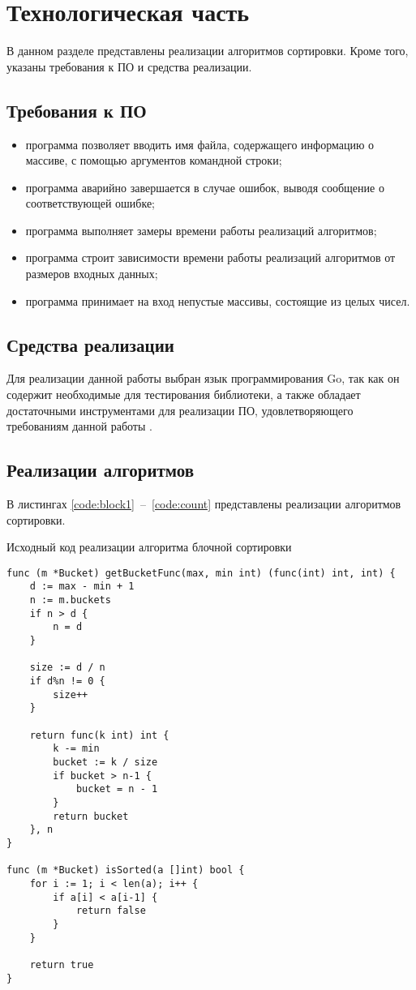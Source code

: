 \chapter{Технологическая часть}

В данном разделе представлены реализации алгоритмов сортировки. Кроме того, указаны требования к ПО и средства реализации.

\section{Требования к ПО}
\begin{itemize}
	\item программа позволяет вводить имя файла, содержащего информацию о массиве, с помощью аргументов командной строки;
	\item программа аварийно завершается в случае ошибок, выводя сообщение о соответствующей ошибке;
	\item программа выполняет замеры времени работы реализаций алгоритмов;
	\item программа строит зависимости времени работы реализаций алгоритмов от размеров входных данных;
	\item программа принимает на вход непустые массивы, состоящие из целых чисел.
\end{itemize}

\section{Средства реализации}
Для реализации данной работы выбран язык программирования Go, так как он содержит необходимые для тестирования библиотеки, а также обладает достаточными инструментами для реализации ПО, удовлетворяющего требованиям данной работы \cite{bib:3}.

\section{Реализации алгоритмов}
В листингах \ref{code:block1}~--~\ref{code:count} представлены реализации алгоритмов сортировки.

\newpage

\begin{code}
\caption{Исходный код реализации алгоритма блочной сортировки}
\label{code:block1}
\begin{verbatim}
func (m *Bucket) getBucketFunc(max, min int) (func(int) int, int) {
	d := max - min + 1
	n := m.buckets
	if n > d {
		n = d
	}
	
	size := d / n
	if d%n != 0 {
		size++
	}
	
	return func(k int) int {
		k -= min
		bucket := k / size
		if bucket > n-1 {
			bucket = n - 1
		}
		return bucket
	}, n
}

func (m *Bucket) isSorted(a []int) bool {
	for i := 1; i < len(a); i++ {
		if a[i] < a[i-1] {
			return false
		}
	}

	return true
}
\end{verbatim}
\end{code}

